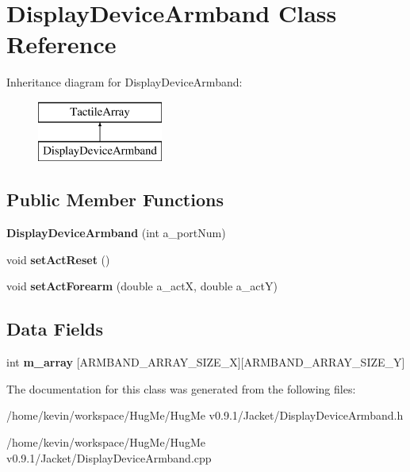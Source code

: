 \hypertarget{classDisplayDeviceArmband}{
\section{DisplayDeviceArmband Class Reference}
\label{classDisplayDeviceArmband}
}
Inheritance diagram for DisplayDeviceArmband:\begin{figure}[H]
\begin{center}
\leavevmode
\includegraphics[height=2cm]{classDisplayDeviceArmband}
\end{center}
\end{figure}
\subsection*{Public Member Functions}
\begin{DoxyCompactItemize}
\item 
\hypertarget{classDisplayDeviceArmband_a6fe8bd8b16190fe162a421cc004dc686}{
{\bfseries DisplayDeviceArmband} (int a\_\-portNum)}
\label{classDisplayDeviceArmband_a6fe8bd8b16190fe162a421cc004dc686}

\item 
\hypertarget{classDisplayDeviceArmband_a645221ffbc870f0bb19c659c36722541}{
void {\bfseries setActReset} ()}
\label{classDisplayDeviceArmband_a645221ffbc870f0bb19c659c36722541}

\item 
\hypertarget{classDisplayDeviceArmband_ab213e4b1d2cc70b5ec302ad7835e74f2}{
void {\bfseries setActForearm} (double a\_\-actX, double a\_\-actY)}
\label{classDisplayDeviceArmband_ab213e4b1d2cc70b5ec302ad7835e74f2}

\end{DoxyCompactItemize}
\subsection*{Data Fields}
\begin{DoxyCompactItemize}
\item 
\hypertarget{classDisplayDeviceArmband_a55fb2729682ab7f7a2b290f396099f06}{
int {\bfseries m\_\-array} \mbox{[}ARMBAND\_\-ARRAY\_\-SIZE\_\-X\mbox{]}\mbox{[}ARMBAND\_\-ARRAY\_\-SIZE\_\-Y\mbox{]}}
\label{classDisplayDeviceArmband_a55fb2729682ab7f7a2b290f396099f06}

\end{DoxyCompactItemize}


The documentation for this class was generated from the following files:\begin{DoxyCompactItemize}
\item 
/home/kevin/workspace/HugMe/HugMe v0.9.1/Jacket/DisplayDeviceArmband.h\item 
/home/kevin/workspace/HugMe/HugMe v0.9.1/Jacket/DisplayDeviceArmband.cpp\end{DoxyCompactItemize}
